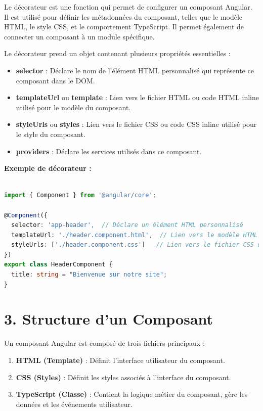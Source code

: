 \documentclass{article}
\begin{document}
Le décorateur \@Component est une fonction qui permet de configurer un composant Angular. Il est utilisé pour définir les métadonnées du composant, telles que le modèle HTML, le style CSS, et le comportement TypeScript. Il permet également de connecter un composant à un module spécifique.

Le décorateur \@Component prend un objet contenant plusieurs propriétés essentielles :
\begin{itemize}
  \item \textbf{selector} : Déclare le nom de l’élément HTML personnalisé qui représente ce composant dans le DOM.
  \item \textbf{templateUrl} ou \textbf{template} : Lien vers le fichier HTML ou code HTML inline utilisé pour le modèle du composant.
  \item \textbf{styleUrls} ou \textbf{styles} : Lien vers le fichier CSS ou code CSS inline utilisé pour le style du composant.
  \item \textbf{providers} : Déclare les services utilisés dans ce composant.
\end{itemize}

\textbf{Exemple de décorateur \@Component :}
\begin{lstlisting}[language=TypeScript, caption={Using a service in a component}, label={lst:typescript-service-usage}]

import { Component } from '@angular/core';

@Component({
  selector: 'app-header',  // Déclare un élément HTML personnalisé
  templateUrl: './header.component.html',  // Lien vers le modèle HTML
  styleUrls: ['./header.component.css']   // Lien vers le fichier CSS du composant
})
export class HeaderComponent {
  title: string = "Bienvenue sur notre site";
}
\end{lstlisting}

\section*{3. Structure d’un Composant}

Un composant Angular est composé de trois fichiers principaux :
\begin{enumerate}
  \item \textbf{HTML (Template)} : Définit l’interface utilisateur du composant.
  \item \textbf{CSS (Styles)} : Définit les styles associés à l’interface du composant.
  \item \textbf{TypeScript (Classe)} : Contient la logique métier du composant, gère les données et les événements utilisateur.
\end{enumerate}
\end{document}
